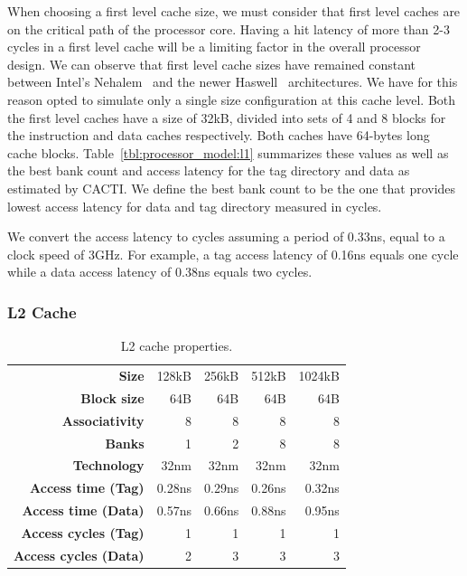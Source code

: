 When choosing a first level cache size, we must consider that first level caches are on the critical path of the processor core.
Having a hit latency of more than 2-3 cycles in a first level cache will be a limiting factor in the overall processor design.
We can observe that first level cache sizes have remained constant between Intel's Nehalem~\cite{Thomadakis2011} and the newer Haswell~\cite{Jain2013} architectures.
We have for this reason opted to simulate only a single size configuration at this cache level.
Both the first level caches have a size of 32kB, divided into sets of 4 and 8 blocks for the instruction and data caches respectively. 
Both caches have 64-bytes long cache blocks.
Table~\ref{tbl:processor_model:l1} summarizes these values as well as the best bank count and access latency for the tag directory and data as estimated by CACTI. 
We define the best bank count to be the one that provides lowest access latency for data and tag directory measured in cycles.

We convert the access latency to cycles assuming a period of 0.33ns, equal to a clock speed of 3GHz.
For example, a tag access latency of 0.16ns equals one cycle while a data access latency of 0.38ns equals two cycles.


\subsubsection{L2 Cache}
\begin{table}[ht]
\centering
\begin{tabular}{rrrrr}
\toprule
\bf{Size}                 & 128kB       & 256kB       & 512kB       & 1024kB            \\
\bf{Block size}           & 64B         & 64B         & 64B         & 64B               \\
\bf{Associativity}        & 8           & 8           & 8           & 8                 \\
\bf{Banks}                & 1           & 2           & 8           & 8                 \\
\bf{Technology}           & 32nm        & 32nm        & 32nm        & 32nm              \\
\bf{Access time (Tag)}    & 0.28ns      & 0.29ns      & 0.26ns      & 0.32ns            \\
\bf{Access time (Data)}   & 0.57ns      & 0.66ns      & 0.88ns      & 0.95ns            \\
\bf{Access cycles (Tag)}  & 1           & 1           & 1           & 1                 \\
\bf{Access cycles (Data)} & 2           & 3           & 3           & 3                 \\
\bottomrule
\end{tabular}
\caption{L2 cache properties.}
\label{tbl:processor_model:l2}
\end{table}

